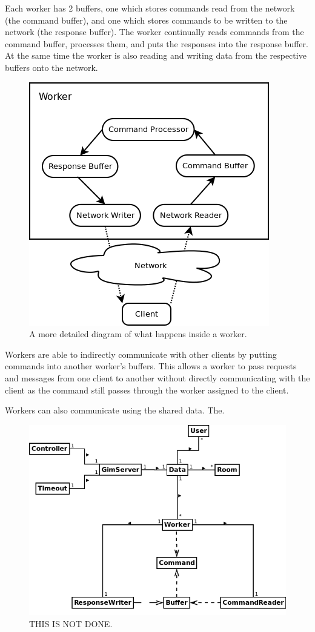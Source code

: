 Each worker has 2 buffers, one which stores commands read from the network (the command buffer), and one which stores commands to be written to the network (the response buffer). The worker continually reads commands from the command buffer, processes them, and puts the responses into the response buffer. At the same time the worker is also reading and writing data from the respective buffers onto the network.

\begin{figure}[!h]
    \begin{center}
        \includegraphics[scale=0.75]{chapter2/diagrams/worker_detail.png}
        \caption{A more detailed diagram of what happens inside a worker.}
        \label{WorkersDia}
    \end{center}
\end{figure}

Workers are able to indirectly communicate with other clients by putting commands into another worker's buffers. This allows a worker to pass requests and messages from one client to another without directly communicating with the client as the command still passes through the worker assigned to the client.

Workers can also communicate using the shared data. The.


\begin{figure}[!h]
    \begin{center}
        \includegraphics[scale=0.65]{chapter2/diagrams/server_uml.png}
        \caption{THIS IS NOT DONE.}
        \label{highLevelDia}
    \end{center}
\end{figure}

